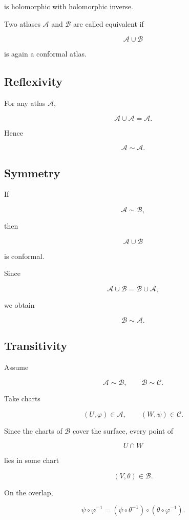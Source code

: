 \documentclass[12pt,a4paper]{article}
\theoremstyle{notespace}
\begin{document}
is holomorphic with holomorphic inverse.

Two atlases \(\mathcal A\) and \(\mathcal B\) are called equivalent if

\[
\mathcal A\cup\mathcal B
\]

is again a conformal atlas.

\subsection*{Reflexivity}

For any atlas \(\mathcal A\),

\[
\mathcal A\cup\mathcal A
=
\mathcal A.
\]

Hence

\[
\mathcal A\sim\mathcal A.
\]

\subsection*{Symmetry}

If

\[
\mathcal A\sim\mathcal B,
\]

then

\[
\mathcal A\cup\mathcal B
\]

is conformal.

Since

\[
\mathcal A\cup\mathcal B
=
\mathcal B\cup\mathcal A,
\]

we obtain

\[
\mathcal B\sim\mathcal A.
\]

\subsection*{Transitivity}

Assume

\[
\mathcal A\sim\mathcal B,
\qquad
\mathcal B\sim\mathcal C.
\]

Take charts

\[
(U,\varphi)\in\mathcal A,
\qquad
(W,\psi)\in\mathcal C.
\]

Since the charts of \(\mathcal B\) cover the surface, every point of

\[
U\cap W
\]

lies in some chart

\[
(V,\theta)\in\mathcal B.
\]

On the overlap,

\[
\psi\circ\varphi^{-1}
=
(\psi\circ\theta^{-1})
\circ
(\theta\circ\varphi^{-1}).
\]
\end{document}
